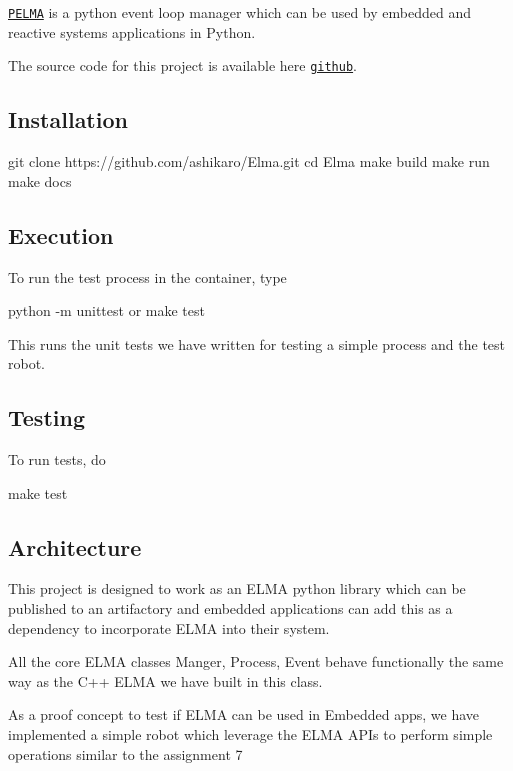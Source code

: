 \href{https://github.com/ashikaro/Elma}{\tt P\+E\+L\+MA} is a python event loop manager which can be used by embedded and reactive systems applications in Python.

The source code for this project is available here \href{https://github.com/ashikaro/Elma}{\tt github}.

\subsection*{Installation }

\begin{DoxyVerb}git clone https://github.com/ashikaro/Elma.git
cd Elma
make build
make run
make docs
\end{DoxyVerb}


\subsection*{Execution }

To run the test process in the container, type \begin{DoxyVerb}python -m unittest
or 
make test
\end{DoxyVerb}


This runs the unit tests we have written for testing a simple process and the test robot.

\subsection*{Testing }

To run tests, do 
\begin{DoxyCode}
make test
\end{DoxyCode}


\subsection*{Architecture }


\begin{DoxyEnumerate}
\item This project is designed to work as an E\+L\+MA python library which can be published to an artifactory and embedded applications can add this as a dependency to incorporate E\+L\+MA into their system.
\end{DoxyEnumerate}
\begin{DoxyEnumerate}
\item All the core E\+L\+MA classes Manger, Process, Event behave functionally the same way as the C++ E\+L\+MA we have built in this class.
\end{DoxyEnumerate}
\begin{DoxyEnumerate}
\item As a proof concept to test if E\+L\+MA can be used in Embedded apps, we have implemented a simple robot which leverage the E\+L\+MA A\+P\+Is to perform simple operations similar to the assignment 7
\end{DoxyEnumerate}

